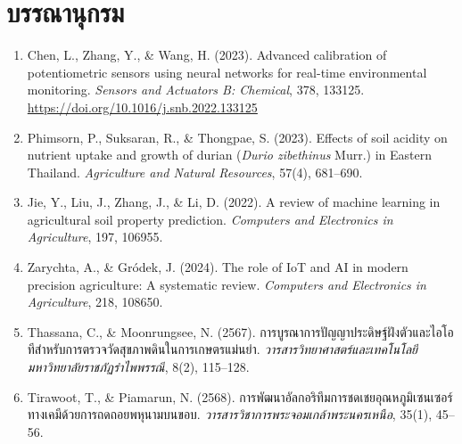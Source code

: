 \chapter*{บรรณานุกรม}

\begin{enumerate}[leftmargin=1.5em, itemsep=6pt]
    \item Chen, L., Zhang, Y., \& Wang, H. (2023). Advanced calibration of potentiometric sensors using neural networks for real-time environmental monitoring. \textit{Sensors and Actuators B: Chemical}, 378, 133125. \url{https://doi.org/10.1016/j.snb.2022.133125}
    \item Phimsorn, P., Suksaran, R., \& Thongpae, S. (2023). Effects of soil acidity on nutrient uptake and growth of durian (\textit{Durio zibethinus} Murr.) in Eastern Thailand. \textit{Agriculture and Natural Resources}, 57(4), 681--690.
    \item Jie, Y., Liu, J., Zhang, J., \& Li, D. (2022). A review of machine learning in agricultural soil property prediction. \textit{Computers and Electronics in Agriculture}, 197, 106955.
    \item Zarychta, A., \& Gródek, J. (2024). The role of IoT and AI in modern precision agriculture: A systematic review. \textit{Computers and Electronics in Agriculture}, 218, 108650.
    \item Thassana, C., \& Moonrungsee, N. (2567). การบูรณาการปัญญาประดิษฐ์ฝังตัวและไอโอทีสำหรับการตรวจวัดสุขภาพดินในการเกษตรแม่นยำ. \textit{วารสารวิทยาศาสตร์และเทคโนโลยี มหาวิทยาลัยราชภัฏรำไพพรรณี}, 8(2), 115--128.
    \item Tirawoot, T., \& Piamarun, N. (2568). การพัฒนาอัลกอริทึมการชดเชยอุณหภูมิเซนเซอร์ทางเคมีด้วยการถดถอยพหุนามบนขอบ. \textit{วารสารวิชาการพระจอมเกล้าพระนครเหนือ}, 35(1), 45--56.
\end{enumerate}

\clearpage

